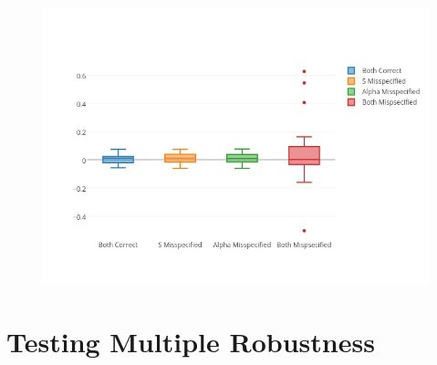 \begin{figure}
\includegraphics[width = \linewidth]{figures/boxplot.jpg}
\caption{}
\label{boxplot}
\end{figure} 




\section{Testing Multiple Robustness} 

